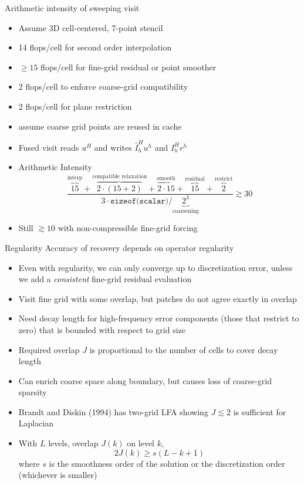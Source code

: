 \documentclass{beamer}
\begin{document}
\begin{frame}{Arithmetic intensity of sweeping visit}
  \begin{itemize}
  \item Assume 3D cell-centered, 7-point stencil
  \item 14 flops/cell for second order interpolation
  \item $\ge 15$ flops/cell for fine-grid residual or point smoother
  \item 2 flops/cell to enforce coarse-grid compatibility
  \item 2 flops/cell for plane restriction
  \item assume coarse grid points are reused in cache
  \item Fused visit reads $u^H$ and writes $\hat I_h^H u^h$ and $I_h^H r^h$
  \item Arithmetic Intensity
    \begin{equation}
      \frac{{\overbrace{15}^{\text{interp}}} + {\overbrace{2\cdot (15+2)}^{\text{compatible relaxation}}} + \overbrace{2\cdot 15}^{\text{smooth}} + \overbrace{15}^{\text{residual}} + \overbrace{2}^{\text{restrict}}}{3 \cdot \texttt{sizeof(scalar)} / \underbrace{2^3}_{\text{coarsening}}} \gtrsim 30
    \end{equation}
  \item Still $\gtrsim 10$ with non-compressible fine-grid forcing
  \end{itemize}
\end{frame}

\begin{frame}{Regularity}
  Accuracy of recovery depends on operator regularity
  \begin{itemize}
  \item Even with regularity, we can only converge up to discretization error, unless we add a \emph{consistent} fine-grid residual evaluation
  \item Visit fine grid with some overlap, but patches do not agree exactly in overlap
  \item Need decay length for high-frequency error components (those that restrict to zero) that is bounded with respect to grid size
  \item Required overlap $J$ is proportional to the number of cells to cover decay length
  \item Can enrich coarse space along boundary, but causes loss of coarse-grid sparsity
  \item Brandt and Diskin (1994) has two-grid LFA showing $J \lesssim 2$ is sufficient for Laplacian
  \item With $L$ levels, overlap $J(k)$ on level $k$,
    \begin{equation*}
      2J(k) \ge s (L-k+1)
    \end{equation*}
    where $s$ is the smoothness order of the solution or the discretization order (whichever is smaller)
  \end{itemize}
\end{frame}
\end{document}
